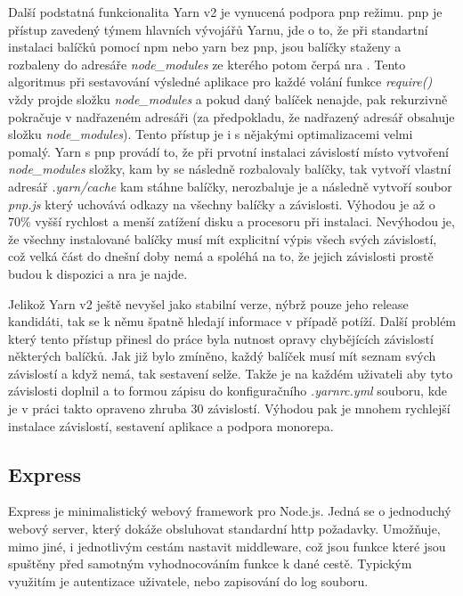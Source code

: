 Další podstatná funkcionalita Yarn v2 je vynucená podpora \acrfull{pnp} režimu. \acrshort{pnp} je přístup zavedený týmem hlavních vývojářů Yarnu, jde o to, že při standartní instalaci balíčků pomocí npm nebo yarn bez pnp, jsou balíčky staženy a rozbaleny do adresáře \emph{node\_modules} ze kterého potom čerpá \acrfull{nra} \cite{joyentinc_1_noderesolutionalgorithm}. Tento algoritmus při sestavování výsledné aplikace pro každé volání funkce \emph{require()} vždy projde složku \emph{node\_modules} a pokud daný balíček nenajde, pak rekurzivně pokračuje v nadřazeném adresáři (za předpokladu, že nadřazený adresář obsahuje složku \emph{node\_modules}). Tento přístup je i s nějakými optimalizacemi velmi pomalý. Yarn s \acrshort{pnp} provádí to, že při prvotní instalaci závislostí místo vytvoření \emph{node\_modules} složky, kam by se následně rozbalovaly balíčky, tak vytvoří vlastní adresář \emph{.yarn/cache} kam stáhne balíčky, nerozbaluje je a následně vytvoří soubor \emph{pnp.js} který uchovává odkazy na všechny balíčky a závislosti. Výhodou je až o 70\% vyšší rychlost a menší zatížení disku a procesoru při instalaci. Nevýhodou je, že všechny instalované balíčky musí mít explicitní výpis všech svých závislostí, což velká část do dnešní doby nemá a spoléhá na to, že jejich závislosti prostě budou k dispozici a \acrshort{nra} je najde.

Jelikož Yarn v2 ještě nevyšel jako stabilní verze, nýbrž pouze jeho release kandidáti, tak se k němu špatně hledají informace v případě potíží. Další problém který tento přístup přinesl do práce byla nutnost opravy chybějících závislostí některých balíčků. Jak již bylo zmíněno, každý balíček musí mít seznam svých závislostí a když nemá, tak sestavení selže. Takže je na každém uživateli aby tyto závislosti doplnil a to formou zápisu do konfiguračního \emph{.yarnrc.yml} souboru, kde je v práci takto opraveno zhruba 30 závislostí. Výhodou pak je mnohem rychlejší instalace závislostí, sestavení aplikace a podpora monorepa.

\subsection{Express}
\label{ss:express}
Express je minimalistický webový framework pro Node.js. Jedná se o jednoduchý webový server, který dokáže obsluhovat standardní http požadavky. Umožňuje, mimo jiné, i jednotlivým cestám nastavit middleware, což jsou funkce které jsou spuštěny před samotným vyhodnocováním funkce k dané cestě. Typickým využitím je autentizace uživatele, nebo zapisování do log souboru.

